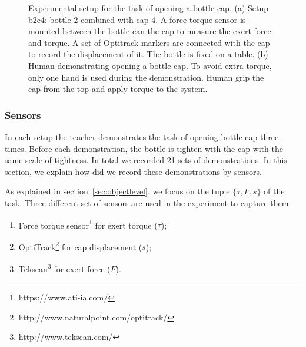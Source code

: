 \begin{figure}
  \centering
  \hspace{1cm}
  \caption{ \scriptsize{Experimental setup for the task of opening a bottle cap. (a) Setup b2c4: bottle 2 combined with cap 4. A force-torque sensor is mounted between the bottle can the cap to measure the exert force and torque. A set of Optitrack markers are connected with the cap to record the displacement of it. The bottle is fixed on a table. (b) Human demonstrating opening a bottle cap. To avoid extra torque, only one hand is used during the demonstration. Human grip the cap from the top and apply torque to the system. }
}
\label{fig:setup}
\end{figure}

\subsubsection{Sensors}
\label{sec:sensor}
In each setup the teacher demonstrates the task of opening bottle cap three times. Before each demonstration, the bottle is tighten with the cap with the same scale of tightness. In total we recorded 21 sets of demonstrations. In this section, we explain how did we record these demonstrations by sensors.



As explained in section~\ref{sec:objectlevel}, we focus on the tuple $\{\tau,F,s\}$ of the task. Three different set of sensors are used in the experiment to capture them:

\begin{enumerate}
\item Force torque sensor\footnote{https://www.ati-ia.com/} for exert torque ($\tau$);
\item OptiTrack\footnote{http://www.naturalpoint.com/optitrack/} for cap displacement ($s$);
\item Tekscan\footnote{http://www.tekscan.com/} for exert force ($F$).
\end{enumerate}

